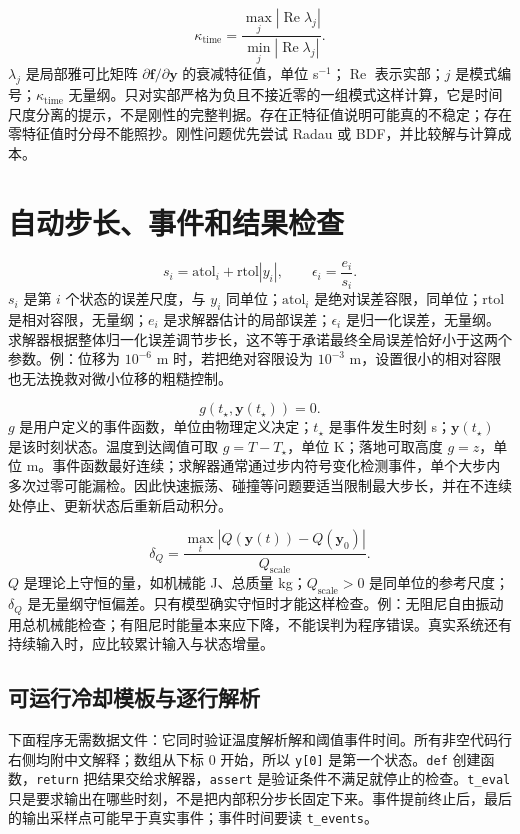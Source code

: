 \documentclass[UTF8,zihao=-4,openany,oneside,fontset=windows]{ctexbook}
\begin{document}
\begin{equation}
\kappa_{\mathrm{time}}=\frac{\max_j |\operatorname{Re}\lambda_j|}{\min_j |\operatorname{Re}\lambda_j|}.
\end{equation}
$\lambda_j$ 是局部雅可比矩阵 $\partial\boldsymbol f/\partial\boldsymbol y$ 的衰减特征值，单位 s$^{-1}$；$\operatorname{Re}$ 表示实部；$j$ 是模式编号；$\kappa_{\mathrm{time}}$ 无量纲。只对实部严格为负且不接近零的一组模式这样计算，它是时间尺度分离的提示，不是刚性的完整判据。存在正特征值说明可能真的不稳定；存在零特征值时分母不能照抄。刚性问题优先尝试 Radau 或 BDF，并比较解与计算成本。

\section{自动步长、事件和结果检查}
\begin{equation}
s_i=\mathrm{atol}_i+\mathrm{rtol}|y_i|,\qquad
\epsilon_i=\frac{e_i}{s_i}.
\end{equation}
$s_i$ 是第 $i$ 个状态的误差尺度，与 $y_i$ 同单位；$\mathrm{atol}_i$ 是绝对误差容限，同单位；$\mathrm{rtol}$ 是相对容限，无量纲；$e_i$ 是求解器估计的局部误差；$\epsilon_i$ 是归一化误差，无量纲。求解器根据整体归一化误差调节步长，这不等于承诺最终全局误差恰好小于这两个参数。例：位移为 $10^{-6}$ m 时，若把绝对容限设为 $10^{-3}$ m，设置很小的相对容限也无法挽救对微小位移的粗糙控制。

\begin{equation}
g(t_\star,\boldsymbol y(t_\star))=0.
\end{equation}
$g$ 是用户定义的事件函数，单位由物理定义决定；$t_\star$ 是事件发生时刻 s；$\boldsymbol y(t_\star)$ 是该时刻状态。温度到达阈值可取 $g=T-T_\star$，单位 K；落地可取高度 $g=z$，单位 m。事件函数最好连续；求解器通常通过步内符号变化检测事件，单个大步内多次过零可能漏检。因此快速振荡、碰撞等问题要适当限制最大步长，并在不连续处停止、更新状态后重新启动积分。

\begin{equation}
\delta_Q=\frac{\max_t |Q(\boldsymbol y(t))-Q(\boldsymbol y_0)|}{Q_{\mathrm{scale}}}.
\end{equation}
$Q$ 是理论上守恒的量，如机械能 J、总质量 kg；$Q_{\mathrm{scale}}>0$ 是同单位的参考尺度；$\delta_Q$ 是无量纲守恒偏差。只有模型确实守恒时才能这样检查。例：无阻尼自由振动用总机械能检查；有阻尼时能量本来应下降，不能误判为程序错误。真实系统还有持续输入时，应比较累计输入与状态增量。

\subsection{可运行冷却模板与逐行解析}
下面程序无需数据文件：它同时验证温度解析解和阈值事件时间。所有非空代码行右侧均附中文解释；数组从下标 0 开始，所以 \texttt{y[0]} 是第一个状态。\texttt{def} 创建函数，\texttt{return} 把结果交给求解器，\texttt{assert} 是验证条件不满足就停止的检查。\texttt{t\_eval} 只是要求输出在哪些时刻，不是把内部积分步长固定下来。事件提前终止后，最后的输出采样点可能早于真实事件；事件时间要读 \texttt{t\_events}。
\end{document}
